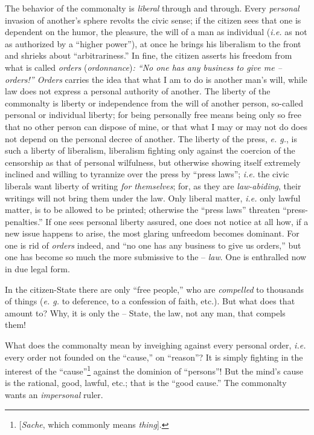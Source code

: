 \documentclass[12pt,a4paper]{book}
\begin{document}
The behavior of the commonalty is \textit{liberal} through and through. Every 
\textit{personal} invasion of another's sphere revolts the civic sense; if the 
citizen sees that one is dependent on the humor, the pleasure, the will of a 
man as individual (\textit{i.e.} as not as authorized by a ``higher 
power''), at once he brings his liberalism to the front and shrieks about 
``arbitrariness.'' In fine, the citizen asserts his freedom from what is 
called \textit{orders} (\textit{ordonnance})\textit{: ``No one has any 
business to give me -- orders!'' Orders} carries the idea that what I am to 
do is another man's will, while law does not express a personal authority of 
another. The liberty of the commonalty is liberty or independence from the 
will of another person, so-called personal or individual liberty; for being 
personally free means being only so free that no other person can dispose of 
mine, or that what I may or may not do does not depend on the personal decree 
of another. The liberty of the press, \textit{e. g.}, is such a liberty of 
liberalism, liberalism fighting only against the coercion of the censorship as 
that of personal wilfulness, but otherwise showing itself extremely inclined 
and willing to tyrannize over the press by ``press laws''; \textit{i.e.} the 
civic liberals want liberty of writing \textit{for themselves}; for, as they 
are \textit{law-abiding}, their writings will not bring them under the law. 
Only liberal matter, \textit{i.e.} only lawful matter, is to be allowed to be 
printed; otherwise the ``press laws'' threaten ``press-penalties.'' If one 
sees personal liberty assured, one does not notice at all how, if a new issue 
happens to arise, the most glaring unfreedom becomes dominant. For one is rid 
of \textit{orders} indeed, and ``no one has any business to give us 
orders,'' but one has become so much the more submissive to the -- 
\textit{law}. One is enthralled now in due legal form.

In the citizen-State there are only ``free people,'' who are 
\textit{compelled} to thousands of things (\textit{e. g.} to deference, to a 
confession of faith, etc.). But what does that amount to? Why, it is only the 
-- State, the law, not any man, that compels them!

What does the commonalty mean by inveighing against every personal order, 
\textit{i.e.} every order not founded on the ``cause,'' on ``reason''? It 
is simply fighting in the interest of the 
``cause''\footnote{[\textit{Sache}, which commonly means \textit{thing}].} 
against the dominion of ``persons''! But the mind's cause is the rational, 
good, lawful, etc.; that is the ``good cause.'' The commonalty wants an 
\textit{impersonal} ruler.
\end{document}
